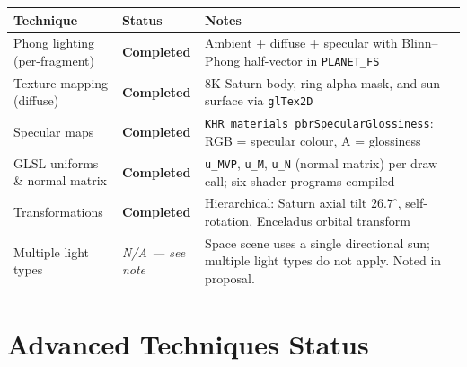 \documentclass[11pt,a4paper]{article}
\newcommand{\Done}{\textcolor{done}{\textbf{Completed}}}
\newcommand{\NA}{\textcolor{na}{\textit{N/A --- see note}}}
\begin{document}
\smallskip
\begin{tabular}{@{}p{5.5cm}p{2.5cm}p{7.2cm}@{}}
\toprule
Technique & Status & Notes \\
\midrule
Phong lighting (per-fragment) & \Done
  & Ambient + diffuse + specular with Blinn--Phong half-vector in \texttt{PLANET\_FS} \\
Texture mapping (diffuse)     & \Done
  & 8K Saturn body, ring alpha mask, and sun surface via \texttt{glTex2D} \\
Specular maps                 & \Done
  & \texttt{KHR\_materials\_pbrSpecularGlossiness}: RGB = specular colour,
    A = glossiness \\
GLSL uniforms \& normal matrix & \Done
  & \texttt{u\_MVP}, \texttt{u\_M}, \texttt{u\_N} (normal matrix) per draw call;
    six shader programs compiled \\
Transformations               & \Done
  & Hierarchical: Saturn axial tilt $26.7^{\circ}$, self-rotation,
    Enceladus orbital transform \\
Multiple light types          & \NA
  & Space scene uses a single directional sun; multiple light
    types do not apply. Noted in proposal. \\
\bottomrule
\end{tabular}

\section{Advanced Techniques Status}
\end{document}
